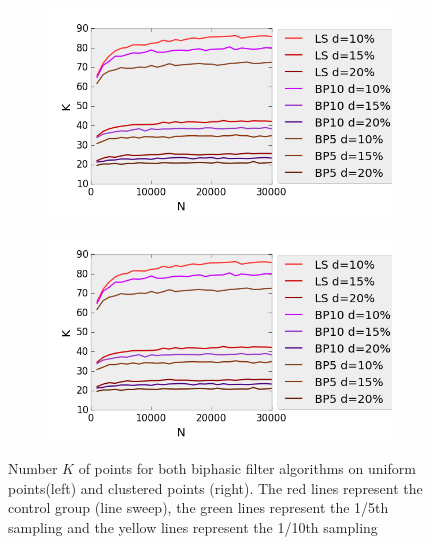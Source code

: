 \begin{figure}[H] 
  \begin{subfigure}[b]{0.5\linewidth}
    \centering
    \includegraphics[width=0.9\linewidth]{Pictures/unif_ls_bp_k} 
    \label{fig:unif_ls_bp_k} 
    \vspace{4ex}
  \end{subfigure}%
  \begin{subfigure}[b]{0.5\linewidth}
    \centering
    \includegraphics[width=0.9\linewidth]{Pictures/unif_ls_bp_k} 
    \label{fig:clus_ls_bp_k} 
    \vspace{4ex}
  \end{subfigure}
  \caption{Number $K$ of points for both biphasic filter algorithms on uniform points(left) and clustered points (right). The red lines represent the control group (line sweep), the green lines represent the 1/5th sampling and the yellow lines represent the 1/10th sampling}
  \label{fig:ls_bp_k} 
\end{figure}


